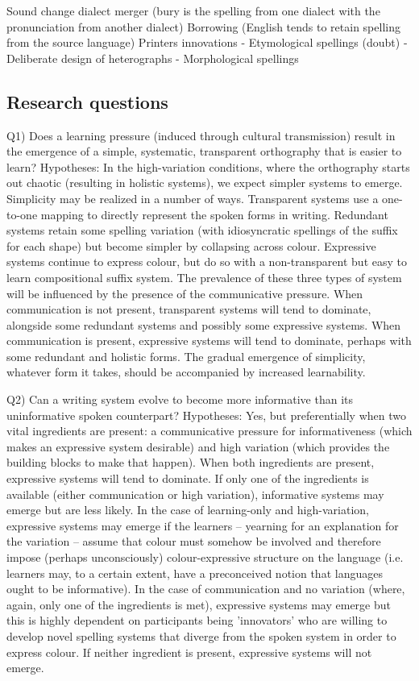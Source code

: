 \documentclass[doc,biblatex]{apa7}
\begin{document}
Sound change
dialect merger (bury is the spelling from one dialect with the pronunciation from another dialect)
Borrowing (English tends to retain spelling from the source language)
Printers innovations
- Etymological spellings (doubt)
- Deliberate design of heterographs
- Morphological spellings

\subsection{Research questions}

Q1) Does a learning pressure (induced through cultural transmission) result in the emergence of a simple, systematic, transparent orthography that is easier to learn? Hypotheses: In the high-variation conditions, where the orthography starts out chaotic (resulting in holistic systems), we expect simpler systems to emerge. Simplicity may be realized in a number of ways. Transparent systems use a one-to-one mapping to directly represent the spoken forms in writing. Redundant systems retain some spelling variation (with idiosyncratic spellings of the suffix for each shape) but become simpler by collapsing across colour. Expressive systems continue to express colour, but do so with a non-transparent but easy to learn compositional suffix system. The prevalence of these three types of system will be influenced by the presence of the communicative pressure. When communication is not present, transparent systems will tend to dominate, alongside some redundant systems and possibly some expressive systems. When communication is present, expressive systems will tend to dominate, perhaps with some redundant and holistic forms. The gradual emergence of simplicity, whatever form it takes, should be accompanied by increased learnability.

Q2) Can a writing system evolve to become more informative than its uninformative spoken counterpart? Hypotheses: Yes, but preferentially when two vital ingredients are present: a communicative pressure for informativeness (which makes an expressive system desirable) and high variation (which provides the building blocks to make that happen). When both ingredients are present, expressive systems will tend to dominate. If only one of the ingredients is available (either communication or high variation), informative systems may emerge but are less likely. In the case of learning-only and high-variation, expressive systems may emerge if the learners – yearning for an explanation for the variation – assume that colour must somehow be involved and therefore impose (perhaps unconsciously) colour-expressive structure on the language (i.e. learners may, to a certain extent, have a preconceived notion that languages ought to be informative). In the case of communication and no variation (where, again, only one of the ingredients is met), expressive systems may emerge but this is highly dependent on participants being 'innovators' who are willing to develop novel spelling systems that diverge from the spoken system in order to express colour. If neither ingredient is present, expressive systems will not emerge.
\end{document}
